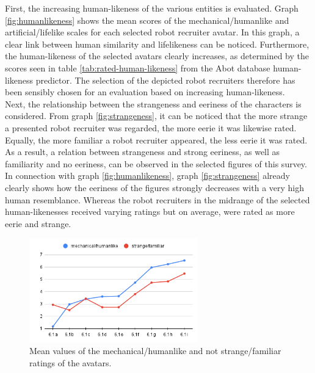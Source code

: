 First, the increasing human-likeness of the various entities is evaluated. Graph \ref{fig:humanlikeness} shows the mean scores of the mechanical/humanlike and artificial/lifelike scales for each selected robot recruiter avatar. In this graph, a clear link between human similarity and lifelikeness can be noticed. Furthermore, the human-likeness of the selected avatars clearly increases, as determined by the scores seen in table \ref{tab:rated-human-likeness} from the Abot database human-likeness predictor. The selection of the depicted robot recruiters therefore has been sensibly chosen for an evaluation based on increasing human-likeness.\\
Next, the relationship between the strangeness and eeriness of the characters is considered. From graph \ref{fig:strangeness}, it can be noticed that the more strange a presented robot recruiter was regarded, the more eerie it was likewise rated. Equally, the more familiar a robot recruiter appeared, the less eerie it was rated. As a result, a relation between strangeness and strong eeriness, as well as familiarity and no eeriness, can be observed in the selected figures of this survey. In connection with graph \ref{fig:humanlikeness}, graph \ref{fig:strangeness} already clearly shows how the eeriness of the figures strongly decreases with a very high human resemblance. Whereas the robot recruiters in the midrange of the selected human-likenesses received varying ratings but on average, were rated as more eerie and strange.\par
\begin{figure} %
    \centering
    \includegraphics[width=0.65\textwidth]{graphics/result/result3.png}
    \caption{Mean values of the mechanical/humanlike and not strange/familiar ratings of the avatars.}
    \label{fig:uncanny_valley_result}
\end{figure}
